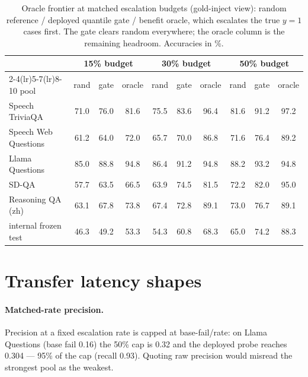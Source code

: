 \begin{table}[h]
\centering\footnotesize
\setlength{\tabcolsep}{4.5pt}
\caption{Oracle frontier at matched escalation budgets (gold-inject
view): random reference / deployed quantile gate / benefit oracle,
which escalates the true $y{=}1$ cases first. The gate clears random
everywhere; the oracle column is the remaining headroom. Accuracies
in \%.}
\label{tab:oracle}
\begin{tabular}{lccccccccc}
\toprule
& \multicolumn{3}{c}{15\% budget} & \multicolumn{3}{c}{30\% budget} & \multicolumn{3}{c}{50\% budget} \\
\cmidrule(lr){2-4}\cmidrule(lr){5-7}\cmidrule(lr){8-10}
pool & rand & gate & oracle & rand & gate & oracle & rand & gate & oracle \\
\midrule
Speech TriviaQA & 71.0 & 76.0 & 81.6 & 75.5 & 83.6 & 96.4 & 81.6 & 91.2 & 97.2 \\
Speech Web Questions & 61.2 & 64.0 & 72.0 & 65.7 & 70.0 & 86.8 & 71.6 & 76.4 & 89.2 \\
Llama Questions & 85.0 & 88.8 & 94.8 & 86.4 & 91.2 & 94.8 & 88.2 & 93.2 & 94.8 \\
SD-QA & 57.7 & 63.5 & 66.5 & 63.9 & 74.5 & 81.5 & 72.2 & 82.0 & 95.0 \\
Reasoning QA (zh) & 63.1 & 67.8 & 73.8 & 67.4 & 72.8 & 89.1 & 73.0 & 76.7 & 89.1 \\
\midrule
internal frozen test & 46.3 & 49.2 & 53.3 & 54.3 & 60.8 & 68.3 & 65.0 & 74.2 & 88.3 \\
\bottomrule
\end{tabular}
\end{table}

\section{Transfer latency shapes}
\label{app:transferdetail}

\paragraph{Matched-rate precision.} Precision at a fixed escalation
rate is capped at base-fail/rate: on Llama Questions (base fail 0.16)
the 50\% cap is 0.32 and the deployed probe reaches 0.304 --- 95\% of
the cap (recall 0.93). Quoting raw precision would misread the
strongest pool as the weakest.

